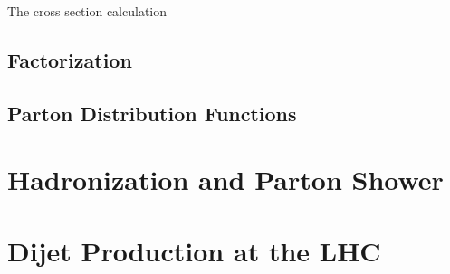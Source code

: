 The cross section calculation 

\subsection{Factorization}


\subsection{Parton Distribution Functions}




\section{Hadronization and Parton Shower}
\section{Dijet Production at the LHC}

